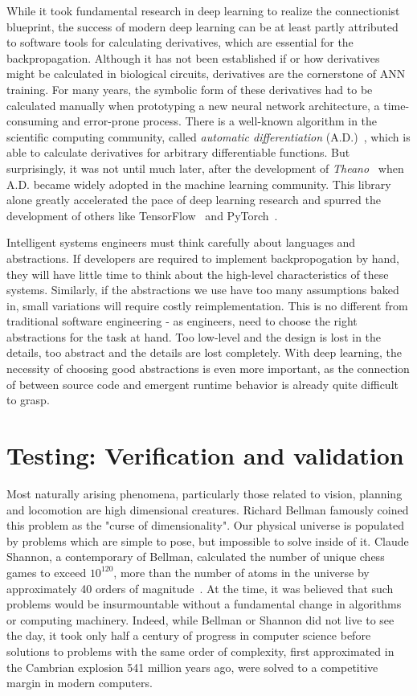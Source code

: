 \documentclass[12pt,initial,twoside,maitrise]{dms}
\numberwithin{equation}{section}
\numberwithin{table}{chapter}
\numberwithin{figure}{chapter}
\begin{document}
While it took fundamental research in deep learning to realize the connectionist blueprint, the success of modern deep learning can be at least partly attributed to software tools for calculating derivatives, which are essential for the backpropagation. Although it has not been established if or how derivatives might be calculated in biological circuits, derivatives are the cornerstone of ANN training. For many years, the symbolic form of these derivatives had to be calculated manually when prototyping a new neural network architecture, a time-consuming and error-prone process. There is a well-known algorithm in the scientific computing community, called \textit{automatic differentiation} (A.D.)~\cite{linnainmaa1970representation, griewank1989automatic}, which is able to calculate derivatives for arbitrary differentiable functions. But surprisingly, it was not until much later, after the development of \textit{Theano}~\cite{theano} when A.D. became widely adopted in the machine learning community. This library alone greatly accelerated the pace of deep learning research and spurred the development of others like TensorFlow~\cite{abadi2016tensorflow} and PyTorch~\cite{paszke2017automatic}.

Intelligent systems engineers must think carefully about languages and abstractions. If developers are required to implement backpropogation by hand, they will have little time to think about the high-level characteristics of these systems. Similarly, if the abstractions we use have too many assumptions baked in, small variations will require costly reimplementation. This is no different from traditional software engineering - as engineers, need to choose the right abstractions for the task at hand. Too low-level and the design is lost in the details, too abstract and the details are lost completely. With deep learning, the necessity of choosing good abstractions is even more important, as the connection of between source code and emergent runtime behavior is already quite difficult to grasp.

\section{Testing: Verification and validation}

Most naturally arising phenomena, particularly those related to vision, planning and locomotion are high dimensional creatures. Richard Bellman famously coined this problem as the "curse of dimensionality". Our physical universe is populated by problems which are simple to pose, but impossible to solve inside of it. Claude Shannon, a contemporary of Bellman, calculated the number of unique chess games to exceed $10^{120}$, more than the number of atoms in the universe by approximately 40 orders of magnitude~\cite{shannon1950xxii}. At the time, it was believed that such problems would be insurmountable without a fundamental change in algorithms or computing machinery. Indeed, while Bellman or Shannon did not live to see the day, it took only half a century of progress in computer science before solutions to problems with the same order of complexity, first approximated in the Cambrian explosion 541 million years ago, were solved to a competitive margin in modern computers.
\end{document}
